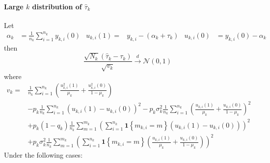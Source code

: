 \documentclass[twoside]{article}
\begin{document}
\paragraph*{Large $k$ distribution of $\hat{\tau}_k$} 
Let
\begin{align*}
    \alpha_k &= \frac{1}{n_k}\sum^{n_k}_{i=1} y_{k,i}(0) & u_{k,i}(1) =& y_{k,i} - (\alpha_k+\tau_k) & u_{k,i}(0) &= y_{k,i}(0)-\alpha_k
\end{align*}
then
$$
\frac{\sqrt{N_k} \left(\hat{\tau}_k-\tau_k\right)}{\sqrt{v_k}} \xrightarrow{d} \mathcal{N}\left(0,1\right)
$$
where 
\begin{align*}
    v_k =& \frac{1}{n_k} \sum^{n_k}_{i=1}\left( \frac{u_{k,i}^2(1)}{\mu_k} + \frac{u^2_{k,i}(0)}{1-\mu_k} \right)\\
    &-p_k \frac{1}{n_k} \sum^{n_k}_{i=1}\left(u_{k,i}(1)-u_{k,i}(0)\right)^2 - p_k\sigma^2_k \frac{1}{n_k} \sum^{n_k}_{i=1} \left( \frac{u_{k,i}(1)}{\mu_k} + \frac{u_{k,i}(0)}{1-\mu_k} \right)^2 \\
    &+ p_k\left(1-q_k\right) \frac{1}{n_k}\sum^{m_k}_{m=1}\left(\sum^{n_k}_{i=1} \mathbf{1}\left\{m_{k,i}=m\right\} \left(u_{k,i}(1)-u_{k,i}(0)\right) \right)^2\\
    &+ p_k\sigma^2_k \frac{1}{n_k}\sum^{m_k}_{m=1} \left(\sum^{n_k}_{i=1} \mathbf{1}\left\{m_{k,i}=m\right\} \left(\frac{u_{k,i}(1)}{\mu_k} + \frac{u_{k,i}(0)}{1-\mu_k}\right)\right)^2
\end{align*}
Under the following cases:
\end{document}
